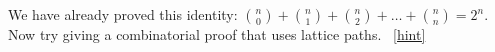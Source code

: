 \documentclass{book}
\begin{document}
\setcounter{project}{96}
\addtocounter{project}{-1}
\begin{activity}[]\label{activity-89}
\hypertarget{p-725}{}%
We have already proved this identity: \(\binom{n}{0} + \binom{n}{1} + \binom{n}{2} + \ldots + \binom{n}{n} = 2^{n}\).  Now try giving a combinatorial proof that uses lattice paths.%
~\hfill{\tiny\hyperlink{a-96}{[hint]}\hypertarget{q-96}{}}\end{activity}
\end{document}
